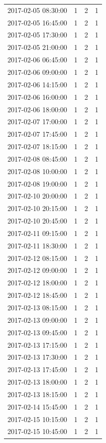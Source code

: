 \begin{tabular}{lrrr}
2017-02-05 08:30:00 & 1 & 2 & 1 \\
2017-02-05 16:45:00 & 1 & 2 & 1 \\
2017-02-05 17:30:00 & 1 & 2 & 1 \\
2017-02-05 21:00:00 & 1 & 2 & 1 \\
2017-02-06 06:45:00 & 1 & 2 & 1 \\
2017-02-06 09:00:00 & 1 & 2 & 1 \\
2017-02-06 14:15:00 & 1 & 2 & 1 \\
2017-02-06 16:00:00 & 1 & 2 & 1 \\
2017-02-06 18:00:00 & 1 & 2 & 1 \\
2017-02-07 17:00:00 & 1 & 2 & 1 \\
2017-02-07 17:45:00 & 1 & 2 & 1 \\
2017-02-07 18:15:00 & 1 & 2 & 1 \\
2017-02-08 08:45:00 & 1 & 2 & 1 \\
2017-02-08 10:00:00 & 1 & 2 & 1 \\
2017-02-08 19:00:00 & 1 & 2 & 1 \\
2017-02-10 20:00:00 & 1 & 2 & 1 \\
2017-02-10 20:15:00 & 1 & 2 & 1 \\
2017-02-10 20:45:00 & 1 & 2 & 1 \\
2017-02-11 09:15:00 & 1 & 2 & 1 \\
2017-02-11 18:30:00 & 1 & 2 & 1 \\
2017-02-12 08:15:00 & 1 & 2 & 1 \\
2017-02-12 09:00:00 & 1 & 2 & 1 \\
2017-02-12 18:00:00 & 1 & 2 & 1 \\
2017-02-12 18:45:00 & 1 & 2 & 1 \\
2017-02-13 08:15:00 & 1 & 2 & 1 \\
2017-02-13 09:00:00 & 1 & 2 & 1 \\
2017-02-13 09:45:00 & 1 & 2 & 1 \\
2017-02-13 17:15:00 & 1 & 2 & 1 \\
2017-02-13 17:30:00 & 1 & 2 & 1 \\
2017-02-13 17:45:00 & 1 & 2 & 1 \\
2017-02-13 18:00:00 & 1 & 2 & 1 \\
2017-02-13 18:15:00 & 1 & 2 & 1 \\
2017-02-14 15:45:00 & 1 & 2 & 1 \\
2017-02-15 10:15:00 & 1 & 2 & 1 \\
2017-02-15 10:45:00 & 1 & 2 & 1 \\

\end{tabular}
